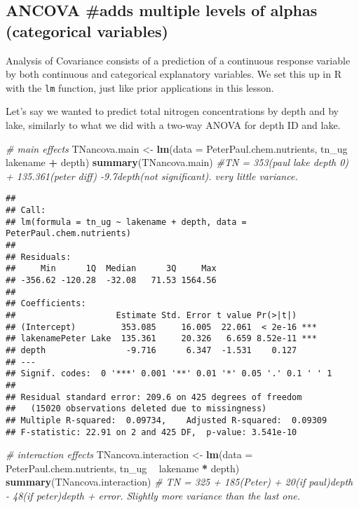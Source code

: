 \documentclass[]{article}
\newenvironment{Shaded}{\begin{snugshade}}{\end{snugshade}}
\newcommand{\KeywordTok}[1]{\textcolor[rgb]{0.13,0.29,0.53}{\textbf{#1}}}
\newcommand{\DataTypeTok}[1]{\textcolor[rgb]{0.13,0.29,0.53}{#1}}
\newcommand{\StringTok}[1]{\textcolor[rgb]{0.31,0.60,0.02}{#1}}
\newcommand{\CommentTok}[1]{\textcolor[rgb]{0.56,0.35,0.01}{\textit{#1}}}
\newcommand{\OperatorTok}[1]{\textcolor[rgb]{0.81,0.36,0.00}{\textbf{#1}}}
\newcommand{\NormalTok}[1]{#1}
\begin{document}
\subsection{ANCOVA \#adds multiple levels of alphas (categorical
variables)}\label{ancova-adds-multiple-levels-of-alphas-categorical-variables}

Analysis of Covariance consists of a prediction of a continuous response
variable by both continuous and categorical explanatory variables. We
set this up in R with the \texttt{lm} function, just like prior
applications in this lesson.

Let's say we wanted to predict total nitrogen concentrations by depth
and by lake, similarly to what we did with a two-way ANOVA for depth ID
and lake.

\begin{Shaded}
\begin{Highlighting}[]
\CommentTok{# main effects}
\NormalTok{TNancova.main <-}\StringTok{ }\KeywordTok{lm}\NormalTok{(}\DataTypeTok{data =}\NormalTok{ PeterPaul.chem.nutrients, tn_ug }\OperatorTok{~}\StringTok{ }\NormalTok{lakename }\OperatorTok{+}\StringTok{ }\NormalTok{depth)}
\KeywordTok{summary}\NormalTok{(TNancova.main) }\CommentTok{#TN = 353(paul lake depth 0) + 135.361(peter diff) -9.7depth(not significant). very little variance.}
\end{Highlighting}
\end{Shaded}

\begin{verbatim}
## 
## Call:
## lm(formula = tn_ug ~ lakename + depth, data = PeterPaul.chem.nutrients)
## 
## Residuals:
##     Min      1Q  Median      3Q     Max 
## -356.62 -120.28  -32.08   71.53 1564.56 
## 
## Coefficients:
##                    Estimate Std. Error t value Pr(>|t|)    
## (Intercept)         353.085     16.005  22.061  < 2e-16 ***
## lakenamePeter Lake  135.361     20.326   6.659 8.52e-11 ***
## depth                -9.716      6.347  -1.531    0.127    
## ---
## Signif. codes:  0 '***' 0.001 '**' 0.01 '*' 0.05 '.' 0.1 ' ' 1
## 
## Residual standard error: 209.6 on 425 degrees of freedom
##   (15020 observations deleted due to missingness)
## Multiple R-squared:  0.09734,    Adjusted R-squared:  0.09309 
## F-statistic: 22.91 on 2 and 425 DF,  p-value: 3.541e-10
\end{verbatim}

\begin{Shaded}
\begin{Highlighting}[]
\CommentTok{# interaction effects}
\NormalTok{TNancova.interaction <-}\StringTok{ }\KeywordTok{lm}\NormalTok{(}\DataTypeTok{data =}\NormalTok{ PeterPaul.chem.nutrients, tn_ug }\OperatorTok{~}\StringTok{ }\NormalTok{lakename }\OperatorTok{*}\StringTok{ }\NormalTok{depth)}
\KeywordTok{summary}\NormalTok{(TNancova.interaction) }\CommentTok{# TN = 325 + 185(Peter) + 20(if paul)depth - 48(if peter)depth + error. Slightly more variance than the last one.}
\end{Highlighting}
\end{Shaded}
\end{document}
